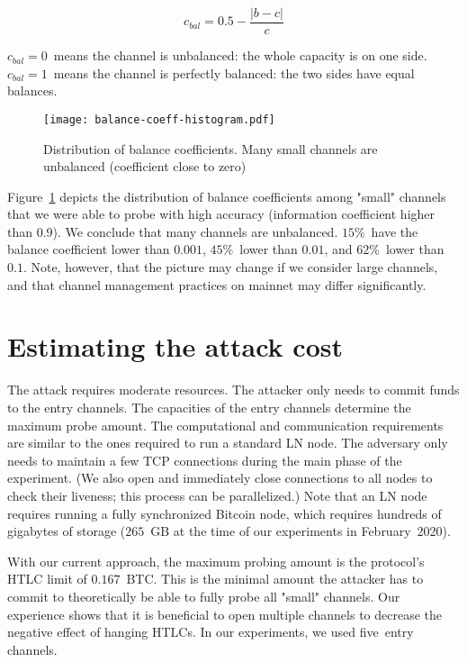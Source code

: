 \[c_{bal} = 0.5 - \frac{|b-c|}{c} \]

$c_{bal} = 0$~means the channel is unbalanced: the whole capacity is on one side.
$c_{bal} = 1$~means the channel is perfectly balanced: the two sides have equal balances.

\begin{figure}[h]
	\centering
	\texttt{[image: balance-coeff-histogram.pdf]}
	\caption{Distribution of balance coefficients. Many small channels are unbalanced (coefficient close to zero)}
	\label{fig:balance-coeff-histogram}
\end{figure}

Figure~\ref{fig:balance-coeff-histogram} depicts the distribution of balance coefficients among "small" channels that we were able to probe with high accuracy (information coefficient higher than $0.9$).
We conclude that many channels are unbalanced.
$15$\%~have the balance coefficient lower than $0.001$, $45\%$~lower than $0.01$, and $62\%$~lower than $0.1$.
Note, however, that the picture may change if we consider large channels, and that channel management practices on mainnet may differ significantly.


\section{Estimating the attack cost}

The attack requires moderate resources.
The attacker only needs to commit funds to the entry channels.
The capacities of the entry channels determine the maximum probe amount.
The computational and communication requirements are similar to the ones required to run a standard LN node.
The adversary only needs to maintain a few TCP connections during the main phase of the experiment.
(We also open and immediately close connections to all nodes to check their liveness; this process can be parallelized.)
Note that an LN node requires running a fully synchronized Bitcoin node, which requires hundreds of gigabytes of storage ($265$~GB at the time of our experiments in February~2020).

With our current approach, the maximum probing amount is the protocol's HTLC limit of $0.167$~BTC.
This is the minimal amount the attacker has to commit to theoretically be able to fully probe all "small" channels.
Our experience shows that it is beneficial to open multiple channels to decrease the negative effect of hanging HTLCs.
In our experiments, we used five~entry channels.

